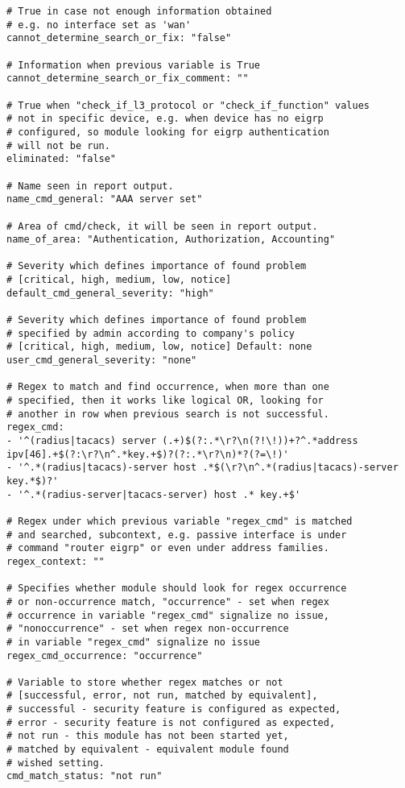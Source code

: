 \begin{lstlisting}
# True in case not enough information obtained 
# e.g. no interface set as 'wan'
cannot_determine_search_or_fix: "false" 

# Information when previous variable is True
cannot_determine_search_or_fix_comment: ""

# True when "check_if_l3_protocol or "check_if_function" values 
# not in specific device, e.g. when device has no eigrp 
# configured, so module looking for eigrp authentication
# will not be run.
eliminated: "false" 

# Name seen in report output.
name_cmd_general: "AAA server set"

# Area of cmd/check, it will be seen in report output.
name_of_area: "Authentication, Authorization, Accounting"

# Severity which defines importance of found problem 
# [critical, high, medium, low, notice]
default_cmd_general_severity: "high" 

# Severity which defines importance of found problem 
# specified by admin according to company's policy
# [critical, high, medium, low, notice] Default: none
user_cmd_general_severity: "none"

# Regex to match and find occurrence, when more than one
# specified, then it works like logical OR, looking for 
# another in row when previous search is not successful.
regex_cmd:
- '^(radius|tacacs) server (.+)$(?:.*\r?\n(?!\!))+?^.*address ipv[46].+$(?:\r?\n^.*key.+$)?(?:.*\r?\n)*?(?=\!)'
- '^.*(radius|tacacs)-server host .*$(\r?\n^.*(radius|tacacs)-server key.*$)?'
- '^.*(radius-server|tacacs-server) host .* key.+$'

# Regex under which previous variable "regex_cmd" is matched
# and searched, subcontext, e.g. passive interface is under
# command "router eigrp" or even under address families.
regex_context: ""

# Specifies whether module should look for regex occurrence
# or non-occurrence match, "occurrence" - set when regex
# occurrence in variable "regex_cmd" signalize no issue, 
# "nonoccurrence" - set when regex non-occurrence 
# in variable "regex_cmd" signalize no issue
regex_cmd_occurrence: "occurrence"

# Variable to store whether regex matches or not 
# [successful, error, not run, matched by equivalent],
# successful - security feature is configured as expected,
# error - security feature is not configured as expected,
# not run - this module has not been started yet,
# matched by equivalent - equivalent module found 
# wished setting.
cmd_match_status: "not run"


\end{lstlisting}
